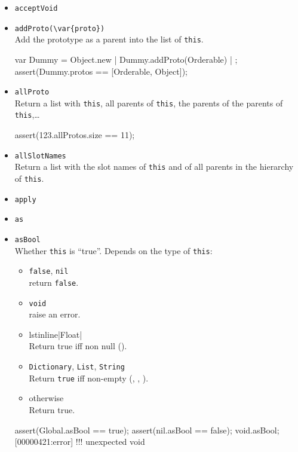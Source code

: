 \begin{itemize}
\item \lstinline|acceptVoid|\\

\item \lstinline|addProto(\var{proto})|\\
  Add the prototype  as a parent into the list of
  \lstinline|this|.

\begin{urbiscript}
var Dummy = Object.new | Dummy.addProto(Orderable) | {};
assert(Dummy.protos == [Orderable, Object]);
\end{urbiscript}

\item \lstinline|allProto|\\
  Return a list with \lstinline|this|, all parents of
  \lstinline|this|, the parents of the parents of
  \lstinline|this|,\ldots
\begin{urbiscript}[firstnumber=last]
assert(123.allProtos.size == 11);
\end{urbiscript}

\item \lstinline|allSlotNames|\\
  Return a list with the slot names of \lstinline|this| and of all
  parents in the hierarchy of \lstinline|this|.

\item \lstinline|apply|\\

\item \lstinline|as|\\

\item \lstinline|asBool|\\
  Whether \lstinline|this| is ``true''.  Depends on the type of
  \lstinline|this|:
  \begin{itemize}
  \item \lstinline|false|, \lstinline|nil|\\
    return \lstinline|false|.
  \item  \lstinline|void|\\
    raise an error.
  \item lstinline|Float|\\
    Return true iff non null ().
  \item \lstinline|Dictionary|, \lstinline|List|,  \lstinline|String|\\
    Return \lstinline|true| iff non-empty (,
    , ).
  \item otherwise\\
    Return true.
  \end{itemize}
\begin{urbiscript}[firstnumber=last]
assert(Global.asBool == true);
assert(nil.asBool ==    false);
void.asBool;
[00000421:error] !!! unexpected void
\end{urbiscript}


\end{itemize}
